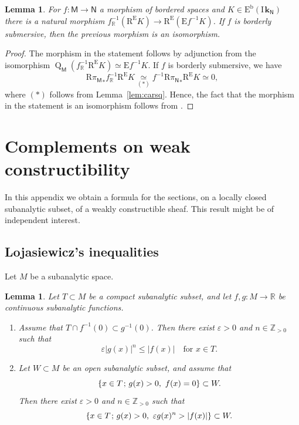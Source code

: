 \documentclass[11pt]{article}
\numberwithin{equation}{section}
\newenvironment{enumeratei}
{\bgroup\def\theenumi{\roman{enumi}}\def\theenumii{\alph{enumii}}\begin{enumerate}}
{\end{enumerate}\egroup}
\let\cl\colon
\newcommand{\semicolon}{\nobreak \mskip2mu\mathpunct{}\nonscript\mkern-\thinmuskip{;}\mskip6mu plus1mu\relax}
\theoremstyle{plain}
\newtheorem{lemma}[theorem]{Lemma}
\theoremstyle{definition}
\newcommand{\R}{\mathbb{R}}
\newcommand{\Z}{\mathbb{Z}}
\DeclareMathOperator{\quot}{Q}
\newcommand{\derived}[1]{\mathrm{#1}}
\newcommand{\dere}{\derived{E}}\let\enh\dere
\newcommand{\derr}{\derived{R}}
\newcommand{\BEC}[2][\ifield]{\dere^{\mathrm{b}}(#1_{#2})}
\newcommand{\roim}[1]{\derr#1_*}
\newcommand{\RE}{\operatorname{R^\enh}}
\newcommand{\Eopb}[1]{\enh#1^{-1}}
\newcommand{\field}{\mathbf{k}}\let\cor\field
\newcommand{\ind}{\mathrm{I}\mspace{2mu}}
\newcommand{\ifield}{\ind\field}
\newcommand{\bbM}{\mathsf{M}}
\newcommand{\bbN}{\mathsf{N}}
\newcommand{\opb}[1]{#1^{-1}}
\begin{document}
\begin{lemma}\label{lem:A3}
For $f\cl\bbM\to\bbN$ a morphism of bordered spaces and $K\in\BEC\bbN$
there is a natural morphism $\opb{f_\R}(\RE K)\to\RE(\Eopb f K)$.
If $f$ is borderly submersive, then the previous morphism is an isomorphism.
\end{lemma}
\begin{proof}
The morphism in the statement follows by adjunction from the isomorphism
$\quot_\bbM(\opb{f_\R}\RE K)\simeq\Eopb f K$.
If $f$ is borderly submersive, we have
\begin{equation*}
\roim{{\pi_\bbM}}\opb{f_\R}\RE K
\underset{(*)}\simeq\opb{f}\roim{{\pi_\bbN}}\RE K
\simeq0,
\end{equation*}
where $(*)$ follows from Lemma~\ref{lem:carsq}.
Hence, the fact that the morphism in the statement is an isomorphism follows from \cite[Prop.\,4.4.4(ii-b)]{DK16}.
\end{proof}

\section{Complements on weak constructibility}\label{se:wc}

In this appendix we obtain a formula for the sections, on a locally closed subanalytic subset, of a weakly constructible sheaf. This result might be of independent interest.

\subsection{Lojasiewicz's inequalities}

Let $ M$ be a subanalytic space.

\begin{lemma}\label{lem:Loj}
Let $T\subset M$ be a compact subanalytic subset, and
let $f,g\colon M\to \R$ be continuous subanalytic functions.
\begin{enumeratei}
\item\label{lem:Loji}
Assume that $T\cap\opb f(0)\subset\opb g(0)$. Then there exist $\varepsilon>0$ and $n\in\Z_{>0}$ such that
\[
\varepsilon|g(x)|^n \leq |f(x)| \quad\text{for }x\in T.
\]
\item\label{lem:Lojii}
Let $W\subset M$ be an open subanalytic subset,
and assume that
\begin{equation}\label{eq:Lojhyp}
\{x\in T\semicolon g(x)>0,\ f(x)=0 \} \subset W.
\end{equation}
Then there exist $\varepsilon>0$ and $n\in\Z_{>0}$ such that
\[
\{x\in T\semicolon g(x)>0,\ \varepsilon g(x)^n>|f(x)| \} \subset W.
\]
\end{enumeratei}
\end{lemma}
\end{document}
